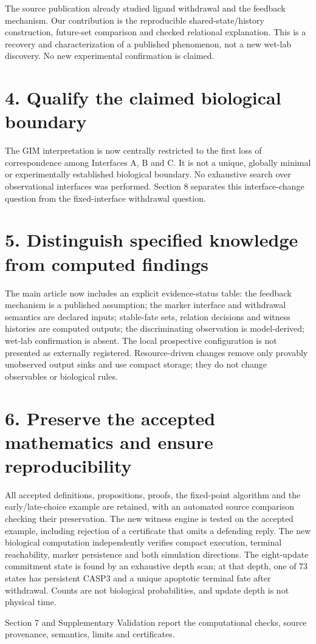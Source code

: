 \documentclass[11pt]{article}
\begin{document}
The source publication already studied ligand withdrawal and the feedback
mechanism. Our contribution is the reproducible shared-state/history
construction, future-set comparison and checked relational explanation.
This is a recovery and characterization of a published phenomenon, not a new
wet-lab discovery. No new experimental confirmation is claimed.

\section*{4. Qualify the claimed biological boundary}

The GIM interpretation is now centrally restricted to the first loss of
correspondence among Interfaces A, B and C. It is not a unique, globally
minimal or experimentally established biological boundary. No exhaustive
search over observational interfaces was performed. Section 8 separates this
interface-change question from the fixed-interface withdrawal question.

\section*{5. Distinguish specified knowledge from computed findings}

The main article now includes an explicit evidence-status table:
the feedback mechanism is a published assumption; the marker interface and
withdrawal semantics are declared inputs; stable-fate sets, relation
decisions and witness histories are computed outputs; the discriminating
observation is model-derived; wet-lab confirmation is absent. The local
prospective configuration is not presented as externally registered.
Resource-driven changes remove only provably unobserved output sinks and use
compact storage; they do not change observables or biological rules.

\section*{6. Preserve the accepted mathematics and ensure reproducibility}

All accepted definitions, propositions, proofs, the fixed-point algorithm and
the early/late-choice example are retained, with an automated source comparison
checking their preservation. The new witness engine is tested on the accepted
example, including rejection of a certificate that omits a defending reply.
The new biological computation independently verifies compact execution,
terminal reachability, marker persistence and both simulation directions.
The eight-update commitment state is found by an exhaustive depth scan; at
that depth, one of 73 states has persistent CASP3 and a unique apoptotic
terminal fate after withdrawal. Counts are not biological probabilities,
and update depth is not physical time.

Section 7 and Supplementary Validation report the computational checks,
source provenance, semantics, limits and certificates.
\end{document}
